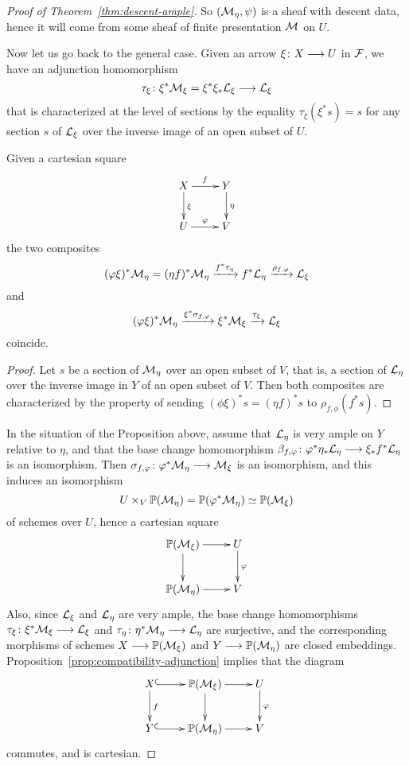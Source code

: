 \begin{4   STACKS}
\begin{4.3 Descent for morphisms of schemes}
\begin{proof}[Proof of Theorem~\ref{thm:descent-ample}]
So $(\mathcal{M}_{\eta},\psi)$ is a \qc sheaf with descent data, hence it will come from some \qc sheaf of finite presentation $\mathcal{M}$ on $U$.

Now let us go back to the general case. Given an arrow $\xi\colon X \arr U$ in $\mathcal{F}$, we have an adjunction homomorphism
   \[
   \tau_{\xi}\colon \xi^{*}\cM_{\xi} = \xi^{*}\xi_{*}\cL_{\xi} \arr \cL_{\xi}
   \]
that is characterized at the level of sections by the equality $\tau_{\xi}(\xi^{*}s) = s$ for any section $s$ of $\mathcal{L}_{\xi}$ over the inverse image of an open subset of $U$.

\begin{proposition}\label{prop:compatibility-adjunction}
Given a cartesian square
   \[
   \xymatrix{
   X \ar[r]^{f} \ar[d]^{\xi} 
   &Y\ar[d]^{\eta}
   \\
   U\ar[r]^{\phi}
   & V
   }
   \]
the two composites
   \[
   (\varphi\xi)^{*}\mathcal{M}_{\eta} = (\eta f)^{*}\mathcal{M}_{\eta} \xrightarrow{f^{*}\tau_{\eta}}
      f^{*}\mathcal{L}_{\eta} \xrightarrow{\rho_{f,\varphi}}
      \mathcal{L}_{\xi}
   \]
and
   \[
   (\varphi\xi)^{*}\mathcal{M}_{\eta} \xrightarrow{\xi^{*}\sigma_{f,\varphi}}
      \xi^{*}\mathcal{M}_{\xi} \xrightarrow{\tau_{\xi}}
      \mathcal{L}_{\xi}
   \]
coincide.
\end{proposition}

\begin{proof}
Let $s$ be a section of $\mathcal{M}_{\eta}$ over an open subset of $V$, that is, a section of $\mathcal{L}_{\eta}$ over the inverse image in $Y$ of an open subset of $V$. Then both composites are characterized by the property of sending $(\phi\xi)^{*}s = (\eta f)^{*}s$ to $\rho_{f,\phi}(f^{*}s)$.
\end{proof}

In the situation of the Proposition above, assume that $\mathcal{L}_{\eta}$ is very ample on $Y$ relative to $\eta$, and that the base change homomorphism $\beta_{f,\phi}\colon \phi^{*}\eta_{*}\cL_{\eta} \arr \xi_{*}f^{*}\cL_{\eta}$ is an isomorphism. Then $\sigma_{f,\phi}\colon \phi^{*}\cM_{\eta} \arr \cM_{\xi}$ is an isomorphism, and this induces an isomorphism
   \[
   U\times_{V} \mathbb{P}(\mathcal{M}_{\eta}) = \mathbb{P}(\varphi^{*}\mathcal{M}_{\eta}) \simeq \mathbb{P}(\mathcal{M}_{\xi})
   \]
of schemes over $U$, hence a cartesian square
   \[
   \xymatrix{
   {}\PP(\cM_{\xi}) \ar[r]\ar[d]
   & U\ar[d]^{\phi}
   \\
   {}\PP(\cM_{\eta}) \ar[r]
   & V
   }
   \]
Also, since $\mathcal{L}_{\xi}$ and $\mathcal{L}_{\eta}$ are very ample, the base change homomorphisms $\tau_{\xi}\colon \xi^{*}\cM_{\xi} \arr \cL_{\xi}$ and $\tau_{\eta}\colon \eta^{*}\cM_{\eta} \arr \cL_{\eta}$ are surjective, and the corresponding morphisms of schemes $X \arr \PP(\cM_{\xi})$ and $Y \arr \PP(\cM_{\eta})$ are closed embeddings. Proposition~\ref{prop:compatibility-adjunction} implies that the diagram
   \[
   \xymatrix{
   X\ar[d]^{f} \ar@{^(->}[r]
   & {}\PP(\cM_{\xi}) \ar[r]\ar[d]
   & U\ar[d]^{\phi}
   \\
   Y \ar@{^(->}[r]
   & {}\PP(\cM_{\eta}) \ar[r]
   & V
   }
   \]
commutes, and is cartesian.


\end{proof}
\end{4.3 Descent for morphisms of schemes}
\end{4   STACKS}
